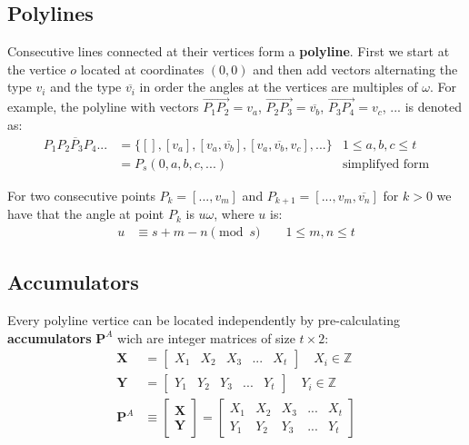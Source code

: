 \documentclass[11pt]{article}
\begin{document}
\subsection{Polylines}

Consecutive lines connected at their vertices form a \textbf{polyline}. First we start at the vertice $o$ located at coordinates $(0,0)$ and then add vectors alternating the type $v_i$ and the type $\overline{v_i}$ in order the angles at the vertices are multiples of $\omega$. For example, the polyline with vectors $\overrightarrow{P_1P_2}=v_a$, $\overrightarrow{P_2P_3}=\overline{v_b}$, $\overrightarrow{P_3P_4}=v_c$, ... is denoted as:
\begin{align}
\overline{P_1P_2P_3P_4...} &= \{ [], [v_a], [v_a,\overline{v_b}],[v_a,\overline{v_b},v_c],... \} 
 & 1 \leq a,b,c \leq t \\
 &= P_s(0,a,b,c,...) & \mbox{simplifyed form}
\end{align}

For two consecutive points $P_k = [...,v_m]$ and $P_{k+1} = [...,v_m,\overline{v_n}]$ for $k>0$ we have that the angle at point $P_k$ is $u\omega$, where $u$ is:
\begin{align}
u &\equiv s + m - n \pmod{s} \quad  \quad 1 \leq m,n \leq t \label{eq:angle}
\end{align}

\subsection{Accumulators}

Every polyline vertice can be located independently by pre-calculating \textbf{accumulators} $\textbf{P}^A$ wich are integer matrices of size $t\times 2$:
\begin{align}
\textbf{X} &= \left[\begin{array}{ccccc}X_1&X_2&X_3&...&X_t
 \end{array}\right]  \quad X_i \in \mathbb{Z}\\
\textbf{Y} &= \left[\begin{array}{ccccc}Y_1&Y_2&Y_3&...&Y_t
 \end{array}\right]  \quad Y_i \in \mathbb{Z}\\
\textbf{P}^A &\equiv \left[\begin{array}{c}\textbf{X} \\ \textbf{Y}
 \end{array}\right]
 = \left[\begin{array}{ccccc}X_1&X_2&X_3&...&X_t
  \\ Y_1&Y_2&Y_3&...&Y_t \end{array}\right] \label{eq:accums}
\end{align}
\end{document}
